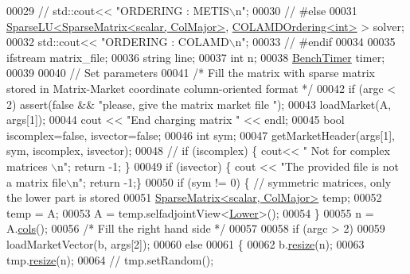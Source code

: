 \begin{DoxyCode}
00029 \textcolor{comment}{//   std::cout<< "ORDERING : METIS\(\backslash\)n"; }
00030 \textcolor{comment}{// #else}
00031   \hyperlink{group___sparse_l_u___module_class_eigen_1_1_sparse_l_u}{SparseLU<SparseMatrix<scalar, ColMajor>}, 
      \hyperlink{group___ordering_methods___module_class_eigen_1_1_c_o_l_a_m_d_ordering}{COLAMDOrdering<int>} >  solver;
00032   std::cout<< \textcolor{stringliteral}{"ORDERING : COLAMD\(\backslash\)n"}; 
00033 \textcolor{comment}{// #endif}
00034   
00035   ifstream matrix\_file; 
00036   \textcolor{keywordtype}{string} line;
00037   \textcolor{keywordtype}{int}  n;
00038   \hyperlink{class_eigen_1_1_bench_timer}{BenchTimer} timer; 
00039   
00040   \textcolor{comment}{// Set parameters}
00041   \textcolor{comment}{/* Fill the matrix with sparse matrix stored in Matrix-Market coordinate column-oriented format */}
00042   \textcolor{keywordflow}{if} (argc < 2) assert(\textcolor{keyword}{false} && \textcolor{stringliteral}{"please, give the matrix market file "});
00043   loadMarket(A, args[1]);
00044   cout << \textcolor{stringliteral}{"End charging matrix "} << endl;
00045   \textcolor{keywordtype}{bool} iscomplex=\textcolor{keyword}{false}, isvector=\textcolor{keyword}{false};
00046   \textcolor{keywordtype}{int} sym;
00047   getMarketHeader(args[1], sym, iscomplex, isvector);
00048 \textcolor{comment}{//   if (iscomplex) \{ cout<< " Not for complex matrices \(\backslash\)n"; return -1; \}}
00049   \textcolor{keywordflow}{if} (isvector) \{ cout << \textcolor{stringliteral}{"The provided file is not a matrix file\(\backslash\)n"}; \textcolor{keywordflow}{return} -1;\}
00050   \textcolor{keywordflow}{if} (sym != 0) \{ \textcolor{comment}{// symmetric matrices, only the lower part is stored}
00051     \hyperlink{group___sparse_core___module_class_eigen_1_1_sparse_matrix}{SparseMatrix<scalar, ColMajor>} temp; 
00052     temp = A;
00053     A = temp.selfadjointView<\hyperlink{group__enums_gga39e3366ff5554d731e7dc8bb642f83cda891792b8ed394f7607ab16dd716f60e6}{Lower}>();
00054   \}
00055   n = A.\hyperlink{group___sparse_core___module_aa391750e3c530227e4a5c3c52e959975}{cols}();
00056   \textcolor{comment}{/* Fill the right hand side */}
00057 
00058   \textcolor{keywordflow}{if} (argc > 2)
00059     loadMarketVector(b, args[2]);
00060   \textcolor{keywordflow}{else} 
00061   \{
00062     b.\hyperlink{class_eigen_1_1_plain_object_base_a99d9054ee2d5a40c6e00ded0265e9cea}{resize}(n);
00063     tmp.\hyperlink{class_eigen_1_1_plain_object_base_a99d9054ee2d5a40c6e00ded0265e9cea}{resize}(n);
00064 \textcolor{comment}{//       tmp.setRandom();}

\end{DoxyCode}
